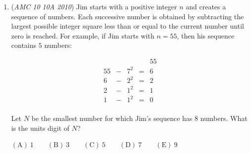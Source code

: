 \begin{enumerate}
 $\textbf{(A)}\ 12 \qquad \textbf{(B)}\ 32 \qquad \textbf{(C)}\ 48 \qquad \textbf{(D)}\ 52 \qquad \textbf{(E)}\ 68$


	\item (\textit{AMC 10 10A 2010}) Jim starts with a positive integer $n$ and creates a sequence of numbers. Each successive number is obtained by subtracting the largest possible integer square less than or equal to the current number until zero is reached. For example, if Jim starts with $n = 55$, then his sequence contains $5$ numbers:


 


 \[\begin{array}{ccccc} {}&{}&{}&{}&55\\ 55&-&7^2&=&6\\ 6&-&2^2&=&2\\ 2&-&1^2&=&1\\ 1&-&1^2&=&0\\ \end{array}\]


 Let $N$ be the smallest number for which Jim’s sequence has $8$ numbers. What is the units digit of $N$?


 $\mathrm{(A)}\ 1 \qquad \mathrm{(B)}\ 3 \qquad \mathrm{(C)}\ 5 \qquad \mathrm{(D)}\ 7 \qquad \mathrm{(E)}\ 9$


\end{enumerate}
